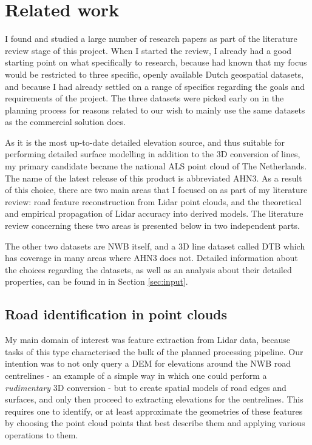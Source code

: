 
\chapter{Related work}
\label{chap:rw}

I found and studied a large number of research papers as part of the literature review stage of this project. When I started the review, I already had a good starting point on what specifically to research, because had known that my focus would be restricted to three specific, openly available Dutch geospatial datasets, and because I had already settled on a range of specifics regarding the goals and requirements of the project. The three datasets were picked early on in the planning process for reasons related to our wish to mainly use the same datasets as the commercial solution does.

As it is the most up-to-date detailed elevation source, and thus suitable for performing detailed surface modelling in addition to the 3D conversion of lines, my primary candidate became the national ALS point cloud of The Netherlands. The name of the latest release of this product is abbreviated AHN3. As a result of this choice, there are two main areas that I focused on as part of my literature review: road feature reconstruction from Lidar point clouds, and the theoretical and empirical propagation of Lidar accuracy into derived models. The literature review concerning these two areas is presented below in two independent parts.

The other two datasets are NWB itself, and a 3D line dataset called DTB which has coverage in many areas where AHN3 does not. Detailed information about the choices regarding the datasets, as well as an analysis about their detailed properties, can be found in in Section \ref{sec:input}.

\section{Road identification in point clouds}
\label{sec:roadidentification}

My main domain of interest was feature extraction from Lidar data, because tasks of this type characterised the bulk of the planned processing pipeline. Our intention was to not only query a DEM for elevations around the NWB road centrelines - an example of a simple way in which one could perform a \textit{rudimentary} 3D conversion - but to create spatial models of road edges and surfaces, and only then proceed to extracting elevations for the centrelines. This requires one to identify, or at least approximate the geometries of these features by choosing the point cloud points that best describe them and applying various operations to them.

